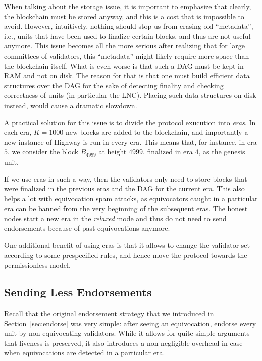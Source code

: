 \documentclass[12pt, fleqn]{article}
\begin{document}
When talking about the storage issue, it is important to emphasize that clearly, the blockchain must be stored anyway, and this is a cost that is impossible to avoid.
%
However, intuitively, nothing should stop us from erasing old ``metadata'', i.e., units that have been used to finalize certain blocks, and thus are not useful anymore.
%
This issue becomes all the more serious after realizing that for large committees of validators, this ``metadata'' might likely require more space than the blockchain itself.
%
What is even worse is that such a DAG must be kept in RAM and not on disk.
%
The reason for that is that one must build efficient data structures over the DAG for the sake of detecting finality and checking correctness of units (in particular the LNC).
%
Placing such data structures on disk instead, would cause a dramatic slowdown. 

A practical solution for this issue is to divide the protocol exucution into {\it eras}.
%
In each era, $K=1000$ new blocks are added to the blockchain, and importantly a new instance of Highway is run in every era.
%
This means that, for instance, in era $5$, we consider the block $B_{4999}$ at height $4999$, finalized in era $4$, as the genesis unit.

If we use eras in such a way, then the validators only need to store blocks that were finalized in the previous eras and the DAG for the current era.
%
This also helps a lot with equivocation spam attacks, as equivocators caught in a particular era can be banned from the very beginning of the subsequent eras.
%
The honest nodes start a new era in the {\it relaxed} mode and thus do not need to send endorsements because of past equivocations anymore.

One additional benefit of using eras is that it allows to change the validator set according to some prespecified rules, and hence move the protocol towards the permissionless model. 

\subsection{Sending Less Endorsements}
Recall that the original endorsement strategy that we introduced in Section~\ref{sec:endorse} was very simple: after seeing an equivocation, endorse every unit by non-equivocating validators.
%
While it allows for quite simple arguments that liveness is preserved, it also introduces a non-negligible overhead in case when equivocations are detected in a particular era.
%
\end{document}
